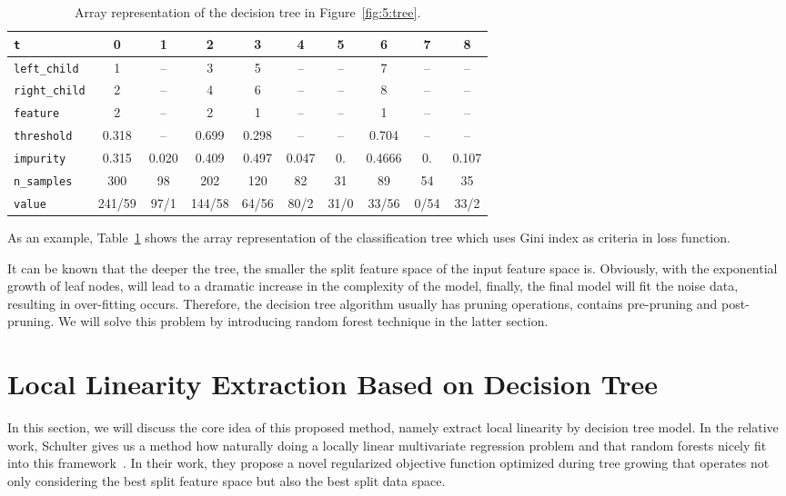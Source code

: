 \documentclass[master]{IPSstyle}
\begin{document}
{\begin{table}[H]
	\centering
    \small
    \hspace{-0.0cm}
    \begin{tabular}{| l | c c c c c c c c c |}
    \hline
    \texttt{t}    & 0 & 1 & 2 & 3 & 4 & 5 & 6 & 7 & 8 \\
    \hline
    \hline
    \texttt{left\_child} & 1 & -- & 3 & 5 & -- & -- & 7 & -- & -- \\
    \texttt{right\_child} & 2 & -- & 4 & 6 & -- & -- & 8 & -- & -- \\
    \texttt{feature} & 2 & -- & 2 & 1 & -- & -- & 1 & -- & -- \\
    \texttt{threshold} & 0.318 & -- & 0.699 & 0.298 & -- & -- & 0.704 & -- & -- \\
    \texttt{impurity} & 0.315 & 0.020& 0.409 & 0.497 &  0.047 &  0. & 0.4666  & 0. &  0.107 \\
    \texttt{n\_samples} & 300 & 98  & 202 & 120  & 82  & 31  & 89  & 54  & 35\\
    \texttt{value} & 241/59 & 97/1 & 144/58 & 64/56 & 80/2 & 31/0 & 33/56 & 0/54 & 33/2 \\
    \hline
    \end{tabular}
    \caption{Array representation of the decision tree in Figure~\ref{fig:5:tree}.}
    \label{table:tree-array}
\end{table}
As an example, Table~\ref{table:tree-array} shows the array representation of the classification tree which uses Gini index as criteria in loss function.

It can be known that the deeper the tree, the smaller the split feature space of the input feature space is. Obviously, with the exponential growth of leaf nodes, will lead to a dramatic increase in the complexity of the model, finally, the final model will fit the noise data, resulting in over-fitting occurs. Therefore, the decision tree algorithm usually has pruning operations, contains pre-pruning and post-pruning. We will solve this problem by introducing random forest technique in the latter section.

\section{Local Linearity Extraction Based on Decision Tree }
In this section, we will discuss the core idea of this proposed method, namely extract local linearity by decision tree model. In the relative work, Schulter gives us a method how naturally doing a locally linear multivariate regression problem and that random forests nicely fit into this framework~\cite{schulter2015fast}. In their work, they propose a novel regularized objective function optimized during tree growing that operates not only considering the best split feature space but also the best split data space.

}
\end{document}
